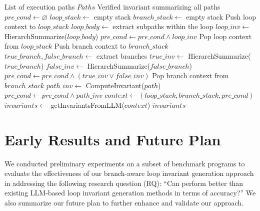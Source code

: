 \documentclass[letterpaper]{article} %
\begin{document}


\begin{algorithm}[t]
\caption{Hierarchical Path Summarization with Verified Invariants}
\label{alg:hierarchical_abstraction}
\begin{algorithmic}[1]
\REQUIRE List of execution paths $Paths$
\ENSURE Verified invariant summarizing all paths
\STATE $pre\_cond \gets \varnothing$ 
\STATE $loop\_stack \gets$ empty stack
\STATE $branch\_stack \gets$ empty stack
        \STATE Push loop context to $loop\_stack$
        \STATE $loop\_body \gets$ extract subpaths within the loop
        \STATE $loop\_inv\gets$HierarchSummarize($loop\_body$)
        \STATE $pre\_cond \gets pre\_cond \wedge loop\_inv$
        \STATE Pop loop context from $loop\_stack$
        \STATE Push branch context to $branch\_stack$
        \STATE $true\_branch, false\_branch \gets$ extract branches
        \STATE $true\_inv \gets$ HierarchSummarize($true\_branch$)
        \STATE $false\_inv \gets$ HierarchSummarize($false\_branch$)
        \STATE $pre\_cond \gets pre\_cond \wedge (true\_inv \vee false\_inv)$
        \STATE Pop branch context from $branch\_stack$
    \ELSE
        \STATE $path\_inv \gets$ ComputeInvariant($path$)
        \STATE $pre\_cond \gets pre\_cond \wedge path\_inv$
    \ENDIF
\ENDFOR
\STATE $context \gets (loop\_stack, branch\_stack, pre\_cond)$
\STATE $invariants \gets$ getInvariantsFromLLM($context$)
\RETURN $invariants$
\end{algorithmic}
\end{algorithm}









\section{Early Results and Future Plan}

We conducted preliminary experiments on a subset of benchmark programs to evaluate the effectiveness of our branch-aware loop invariant generation approach in addressing the following research question (RQ): ``Can \thistool{} perform better than existing LLM-based loop invariant generation methods in terms of accuracy?'' We also summarize our future plan to further enhance and validate our approach.
\end{document}
